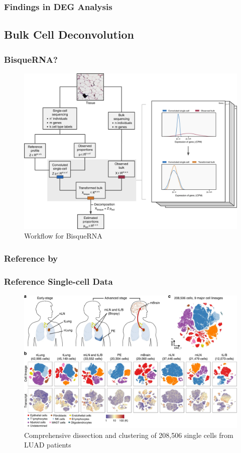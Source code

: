 \documentclass{beamer}
\begin{document}
    \begin{frame}
        \frametitle{Findings in DEG Analysis}
    \end{frame}

    \subsection{Bulk Cell Deconvolution}
    \begin{frame}
        \frametitle{BisqueRNA?}

        \begin{figure}
            \includegraphics[width=0.6 \linewidth]{figures/Workflow/Bisque.jpg}
            \caption{Workflow for BisqueRNA \protect\cite{Bisque1}}
        \end{figure}
    \end{frame}

    \subsubsection{Reference by \protect{}}
    \begin{frame}
        \frametitle{Reference Single-cell Data}

        \begin{figure}
            \includegraphics[width=0.8 \linewidth]{figures/LungCancer/reference_1.jpg}
            \caption{Comprehensive dissection and clustering of 208,506 single cells from LUAD patients \protect\cite{singlecell1}}
        \end{figure}
    \end{frame}
\end{document}
